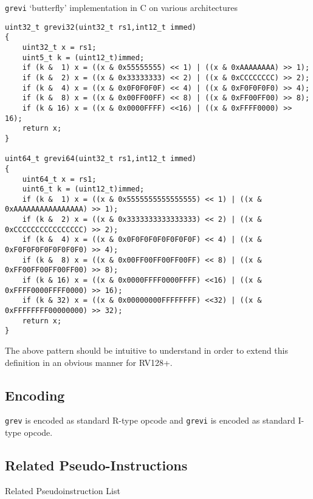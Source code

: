 \texttt{grevi} `butterfly' implementation in C on various architectures

\begin{verbatim}
uint32_t grevi32(uint32_t rs1,int12_t immed)
{
    uint32_t x = rs1;
    uint5_t k = (uint12_t)immed;
    if (k &  1) x = ((x & 0x55555555) << 1) | ((x & 0xAAAAAAAA) >> 1);
    if (k &  2) x = ((x & 0x33333333) << 2) | ((x & 0xCCCCCCCC) >> 2);
    if (k &  4) x = ((x & 0x0F0F0F0F) << 4) | ((x & 0xF0F0F0F0) >> 4);
    if (k &  8) x = ((x & 0x00FF00FF) << 8) | ((x & 0xFF00FF00) >> 8);
    if (k & 16) x = ((x & 0x0000FFFF) <<16) | ((x & 0xFFFF0000) >> 16);
    return x;
}

uint64_t grevi64(uint32_t rs1,int12_t immed)
{
    uint64_t x = rs1;
    uint6_t k = (uint12_t)immed;
    if (k &  1) x = ((x & 0x5555555555555555) << 1) | ((x & 0xAAAAAAAAAAAAAAAA) >> 1);
    if (k &  2) x = ((x & 0x3333333333333333) << 2) | ((x & 0xCCCCCCCCCCCCCCCC) >> 2);
    if (k &  4) x = ((x & 0x0F0F0F0F0F0F0F0F) << 4) | ((x & 0xF0F0F0F0F0F0F0F0) >> 4);
    if (k &  8) x = ((x & 0x00FF00FF00FF00FF) << 8) | ((x & 0xFF00FF00FF00FF00) >> 8);
    if (k & 16) x = ((x & 0x0000FFFF0000FFFF) <<16) | ((x & 0xFFFF0000FFFF0000) >> 16);
    if (k & 32) x = ((x & 0x00000000FFFFFFFF) <<32) | ((x & 0xFFFFFFFF00000000) >> 32);
    return x;
}
\end{verbatim}

The above pattern should be intuitive to understand in order to extend
this definition in an obvious manner for RV128+.

\subsection{Encoding}



\texttt{grev} is encoded as standard R-type opcode and \texttt{grevi} is
encoded as standard I-type opcode.

\subsection{Related Pseudo-Instructions}

Related Pseudoinstruction List

